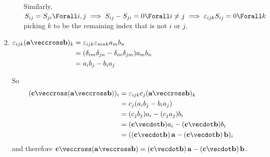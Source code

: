 \documentclass[fleqn,a4paper,11pt]{article}
\begin{document}
\begin{enumerate}[label=\textbf{\arabic*.}]
\begin{enumerate}[label=(\alph*)]
          Similarly,
          \(S_{ij} = S_{ji} \Forall i, j \implies
            S_{ij} - S_{ji} = 0 \Forall i \ne j \implies
            \epsilon_{ijk} S_{ij} = 0 \Forall k\)
          picking \(k\) to be the remaining index that is not \(i\) or \(j\).
   \end{enumerate}
  \item \(
   \begin{aligned}[t]
    \epsilon_{ijk} (\vec a \veccross \vec b)_k
     &= \epsilon_{ijk} \epsilon_{mnk} a_m b_n \\
     &= (\delta_{im} \delta_{jn} - \delta_{in} \delta_{jm}) a_m b_n \\
     &= a_i b_j - b_i a_j
   \end{aligned} \)

   So
   \begin{align*}
    (\vec c \veccross (\vec a \veccross \vec b))_i
     &= \epsilon_{ijk} c_j (\vec a \veccross \vec b)_k \\
     &= c_j (a_i b_j - b_i a_j) \\
     &= (c_j b_j) a_i - (c_j a_j) b_i \\
     &= (\vec c \vecdot \vec b) a_i - (\vec c \vecdot \vec b) b_i \\
     &= ((\vec c \vecdot \vec b)\,\vec a - (\vec c \vecdot \vec b)\,\vec b)_i
   \end{align*}
   and therefore
   \(\vec c \veccross (\vec a \veccross \vec b) =
     (\vec c \vecdot \vec b)\,\vec a - (\vec c \vecdot \vec b)\,\vec b\).
\end{enumerate}
\end{document}

